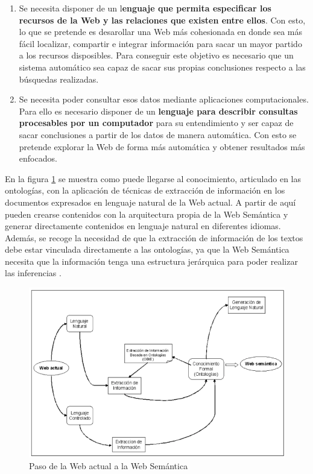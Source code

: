 \begin{enumerate}
	\item Se necesita disponer de un l\textbf{enguaje que permita especificar los recursos de la Web y las relaciones que existen entre ellos}. Con esto, lo que se pretende es desarollar una Web más cohesionada en donde sea más fácil localizar, compartir e integrar información para sacar un mayor partido a los recursos disposibles. Para conseguir este objetivo es necesario que un sistema automático sea capaz de sacar sus propias conclusiones respecto a las búsquedas realizadas.
	
	\item Se necesita poder consultar esos datos mediante aplicaciones computacionales. Para ello es necesario disponer de un \textbf{lenguaje para describir consultas procesables por un computador} para su entendimiento y ser capaz de sacar conclusiones a partir de los datos de manera automática. Con esto se pretende explorar la Web de forma más automática y obtener resultados más enfocados.
\end{enumerate}

En la figura \ref{fig:pasowa-ws} se muestra como puede llegarse al conocimiento, articulado en las ontologías, con la aplicación de técnicas de extracción de información en los documentos expresados en lenguaje natural de la Web actual. A partir de aquí pueden crearse contenidos con la arquitectura propia de la Web Semántica y generar directamente contenidos en lenguaje natural en diferentes idiomas. Además, se recoge la necesidad de que la extracción de información de los textos debe estar vinculada directamente a las ontologías, ya que la Web Semántica necesita que la información tenga una estructura jerárquica para poder realizar las inferencias \cite{researchgate}.

\begin{figure}[H]
	\centering
	\includegraphics[width=0.7\linewidth]{imagenes/capitulo3/pasoWA-WS}
	\caption{Paso de la Web actual a la Web Semántica \cite{researchgate}}
	\label{fig:pasowa-ws}
\end{figure}

